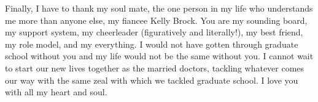 Finally, I have to thank my soul mate, the one person in my life who understands me more than anyone else, my fiancee Kelly Brock. You are my sounding board, my support system, my cheerleader (figuratively and literally!), my best friend, my role model, and my everything. I would not have gotten through graduate school without you and my life would not be the same without you. I cannot wait to start our new lives together as the married doctors, tackling whatever comes our way with the same zeal with which we tackled graduate school. I love you with all my heart and soul. 

